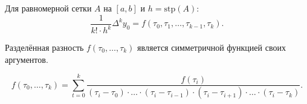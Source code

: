 \begin{lemma}
	Для равномерной сетки $A$ на $[a, b]$ и $h = \mathrm{stp}(A)$:
	\begin{equation*}
		\frac{1}{k! \cdot h^{k}} \Delta^{k} y_0 = f(\tau_0, \tau_1, \dotsc, \tau_{k - 1}, \tau_k).
	\end{equation*}
\end{lemma}

\begin{lemma}
	
	Разделённая разность $f(\tau_0, \dotsc, \tau_k)$ является симметричной функцией своих аргументов.
	
	\begin{equation*}
		\boxed{f(\tau_0, \dotsc, \tau_k) = \sum \limits_{t = 0}^{k} \frac{f(\tau_i)}{(\tau_i - \tau_0) \cdot \dotsc \cdot (\tau_i - \tau_{i - 1}) \cdot (\tau_i - \tau_{i + 1}) \cdot \dotsc \cdot (\tau_i - \tau_k)}}.
	\end{equation*}
\end{lemma}


